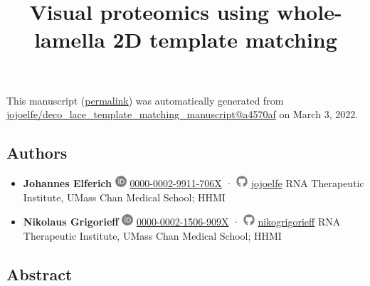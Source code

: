 \documentclass[
]{article}
\title{Visual proteomics using whole-lamella 2D template matching}
\author{}
\date{}
\begin{document}
\maketitle

This manuscript
(\href{https://jojoelfe.github.io/deco_lace_template_matching_manuscript/v/a4570afcb2725b9980fa97358516050b0a2697d3/}{permalink})
was automatically generated
from \href{https://github.com/jojoelfe/deco_lace_template_matching_manuscript/tree/a4570afcb2725b9980fa97358516050b0a2697d3}{jojoelfe/deco\_lace\_template\_matching\_manuscript@a4570af}
on March 3, 2022.

\hypertarget{authors}{%
\subsection{Authors}\label{authors}}

\begin{itemize}
\item
  \textbf{Johannes Elferich}
  \includegraphics[width=0.16667in,height=0.16667in]{images/orcid.pdf}
  \href{https://orcid.org/0000-0002-9911-706X}{0000-0002-9911-706X}
  · \includegraphics[width=0.16667in,height=0.16667in]{images/github.pdf}
  \href{https://github.com/jojoelfe}{jojoelfe}
  RNA Therapeutic Institute, UMass Chan Medical School; HHMI
\item
  \textbf{Nikolaus Grigorieff}
  \includegraphics[width=0.16667in,height=0.16667in]{images/orcid.pdf}
  \href{https://orcid.org/0000-0002-1506-909X}{0000-0002-1506-909X}
  · \includegraphics[width=0.16667in,height=0.16667in]{images/github.pdf}
  \href{https://github.com/nikogrigorieff}{nikogrigorieff}
  RNA Therapeutic Institute, UMass Chan Medical School; HHMI
\end{itemize}

\hypertarget{abstract}{%
\subsection{Abstract}\label{abstract}}
\end{document}
